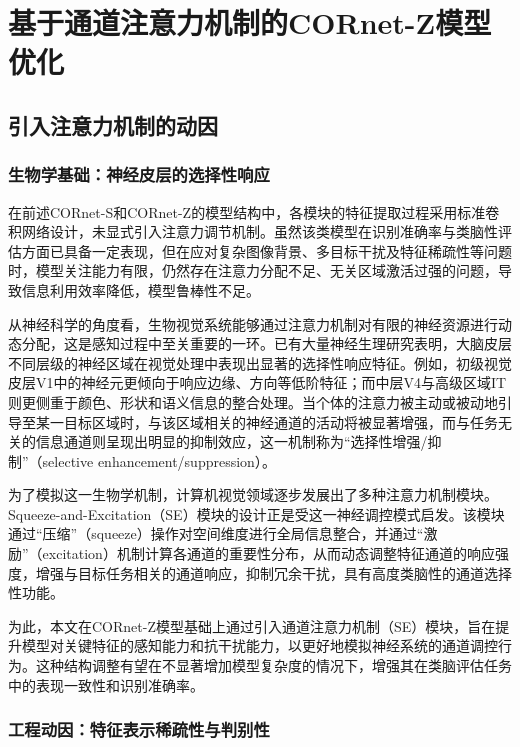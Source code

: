
\chapter{基于通道注意力机制的CORnet-Z模型优化}

\section{引入注意力机制的动因}

\subsection{生物学基础：神经皮层的选择性响应}

在前述CORnet-S和CORnet-Z的模型结构中，各模块的特征提取过程采用标准卷积网络设计，未显式引入注意力调节机制。虽然该类模型在识别准确率与类脑性评估方面已具备一定表现，但在应对复杂图像背景、多目标干扰及特征稀疏性等问题时，模型关注能力有限，仍然存在注意力分配不足、无关区域激活过强的问题，导致信息利用效率降低，模型鲁棒性不足。

从神经科学的角度看，生物视觉系统能够通过注意力机制对有限的神经资源进行动态分配，这是感知过程中至关重要的一环。已有大量神经生理研究表明，大脑皮层不同层级的神经区域在视觉处理中表现出显著的选择性响应特征。例如，初级视觉皮层V1中的神经元更倾向于响应边缘、方向等低阶特征；而中层V4与高级区域IT则更侧重于颜色、形状和语义信息的整合处理。当个体的注意力被主动或被动地引导至某一目标区域时，与该区域相关的神经通道的活动将被显著增强，而与任务无关的信息通道则呈现出明显的抑制效应，这一机制称为“选择性增强/抑制”（selective enhancement/suppression）\cite{dicarlo2012does}。

为了模拟这一生物学机制，计算机视觉领域逐步发展出了多种注意力机制模块。Squeeze-and-Excitation（SE）模块的设计正是受这一神经调控模式启发。该模块通过“压缩”（squeeze）操作对空间维度进行全局信息整合，并通过“激励”（excitation）机制计算各通道的重要性分布，从而动态调整特征通道的响应强度，增强与目标任务相关的通道响应，抑制冗余干扰，具有高度类脑性的通道选择性功能\cite{hu2018squeeze}。

为此，本文在CORnet-Z模型基础上通过引入通道注意力机制（SE）模块，旨在提升模型对关键特征的感知能力和抗干扰能力，以更好地模拟神经系统的通道调控行为。这种结构调整有望在不显著增加模型复杂度的情况下，增强其在类脑评估任务中的表现一致性和识别准确率。

\subsection{工程动因：特征表示稀疏性与判别性}

